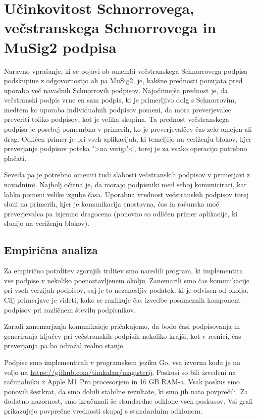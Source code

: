 \section{Učinkovitost Schnorrovega, večstranskega Schnorrovega in MuSig2 podpisa}
\label{sec:primerjava}
Naravno vprašanje, ki se pojavi ob omembi večstranskega Schnorrovega podpisa podskupine z odgovornostjo
ali pa MuSig2, je, kakšne prednosti ponujata pred uporabo več navadnih Schnorrovih podpisov. Najočitnejša
prednost je, da večstranski podpis vrne en sam podpis, ki je primerljivo dolg s Schnorrovim, medtem
ko uporaba individualnih podpisov pomeni, da mora preverjevalec preveriti toliko podpisov, kot je
velika skupina. Ta prednost večstranskega podpisa je posebej pomembna v primerih, ko je preverjevalčev
čas zelo omejen ali drag. Odličen primer je pri vseh aplikacijah, ki temeljijo na veriženju blokov,
kjer preverjanje podpisov poteka ">na verigi"<, torej je za vsako operacijo potrebno plačati.

Seveda pa je potrebno omeniti tudi slabosti večstranskih podpisov v primerjavi z navadnimi. Najbolj
očitna je, da morajo podpisniki med seboj komunicirati, kar lahko pomeni velike izgube časa. Uporabna
vrednost večstranskih podpisov torej sloni na primerih, kjer je komunikacija enostavna, čas in
računska moč preverjevalca pa izjemno dragocena (ponovno so odličen primer aplikacije, ki slonijo
na veriženju blokov).

\subsection{Empirična analiza}
Za empirično potrditev zgornjih trditev smo naredili program, ki implementira vse podpise v nekoliko
poenostavljenem okolju. Zanemarili smo čas komunikacije pri vseh verzijah podpisov, saj je to nezanesljiv
podatek, ki je odvisen od okolja. Cilj primerjave je videti, kako se razlikuje čas izvedbe posameznih
komponent podpisov pri različnem številu podpisnikov.

Zaradi zanemarjanja komunikaicje pričakujemo, da bodo časi podpisovanja in generiranja ključev pri
večstranskih podpisih nekoliko krajši, kot v resnici, čas preverjanja pa bo odražal realno stanje.

Podpise smo implementirali v programskem jeziku Go, vsa izvorna koda je na voljo na
\url{https://github.com/timkalan/magisterij}. Poskusi so bili izvedeni na računalniku z Apple M1 Pro
procesorjem in 16 GB RAM-a. Vsak poskus smo ponovili šestkrat, da smo dobili stabilne rezultate, ki
smo jih nato povprečili. Za dodatno nazornost, smo izračunali še standardne odklone vseh poskusov.
Vsi grafi prikazujejo povprečne vrednosti skupaj s standardnim odklonom.

